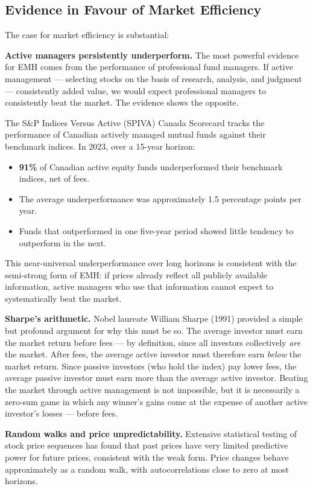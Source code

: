 \documentclass[12pt, letterpaper]{article}
\begin{document}
\subsection{Evidence in Favour of Market Efficiency}


The case for market efficiency is substantial:

\textbf{Active managers persistently underperform.} The most powerful evidence for EMH comes from the performance of professional fund managers. If active management --- selecting stocks on the basis of research, analysis, and judgment --- consistently added value, we would expect professional managers to consistently beat the market. The evidence shows the opposite.

The S\&P Indices Versus Active (SPIVA) Canada Scorecard tracks the performance of Canadian actively managed mutual funds against their benchmark indices. In 2023, over a 15-year horizon:
\begin{itemize}
\item \textbf{91\%} of Canadian active equity funds underperformed their benchmark indices, net of fees.
\item The average underperformance was approximately 1.5 percentage points per year.
\item Funds that outperformed in one five-year period showed little tendency to outperform in the next.
\end{itemize}

This near-universal underperformance over long horizons is consistent with the semi-strong form of EMH: if prices already reflect all publicly available information, active managers who use that information cannot expect to systematically beat the market.

\textbf{Sharpe's arithmetic.} Nobel laureate William Sharpe (1991) provided a simple but profound argument for why this must be so. The average investor must earn the market return before fees --- by definition, since all investors collectively \textit{are} the market. After fees, the average active investor must therefore earn \textit{below} the market return. Since passive investors (who hold the index) pay lower fees, the average passive investor must earn more than the average active investor. Beating the market through active management is not impossible, but it is necessarily a zero-sum game in which any winner's gains come at the expense of another active investor's losses --- before fees.

\textbf{Random walks and price unpredictability.} Extensive statistical testing of stock price sequences has found that past prices have very limited predictive power for future prices, consistent with the weak form. Price changes behave approximately as a random walk, with autocorrelations close to zero at most horizons.
\end{document}

